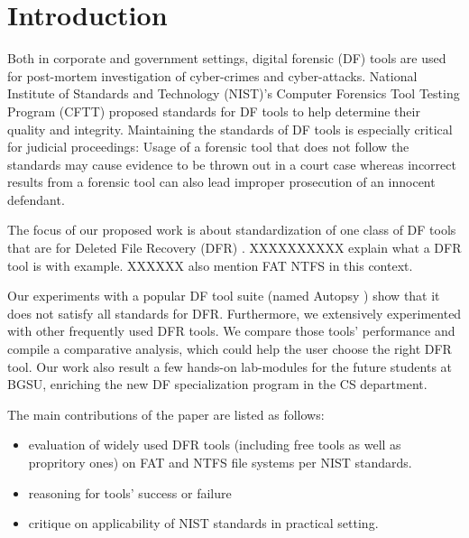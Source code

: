 
\section{Introduction}

Both in corporate and government settings, digital forensic (DF) tools are used for post-mortem investigation of cyber-crimes and cyber-attacks. 
National Institute of Standards and Technology (NIST)'s Computer Forensics Tool Testing Program (CFTT) \cite{cftt:nist} 
proposed standards for DF tools to help determine their quality and integrity. Maintaining the standards of DF tools 
is especially critical for judicial proceedings: Usage of a forensic tool that does not follow the standards may cause evidence to be thrown 
out in a court case whereas incorrect results from a forensic tool can also lead improper prosecution of an innocent defendant. 

The focus of our proposed work is about standardization of one class of DF 
tools that are for Deleted File Recovery (DFR) \cite{meta:dfr:standards}. XXXXXXXXXX explain what a DFR tool is with example. 
XXXXXX also mention FAT NTFS in this context.

 
Our experiments with a popular DF tool suite (named Autopsy \cite{autopsy}) 
show that it does not satisfy all standards for DFR. 
Furthermore, we extensively experimented with other frequently used DFR tools. 
We compare those tools' performance and compile a comparative analysis, which could help the user choose the right DFR tool. 
Our work also result a few hands-on lab-modules for the future students at BGSU, enriching the new DF specialization program in the CS department.

The main contributions of the paper are listed as follows:
\begin{itemize}
\item evaluation of widely used DFR tools (including free tools as well as propritory ones) on FAT and NTFS file systems per NIST standards.
\item reasoning for tools' success or failure
\item critique on applicability of NIST standards in practical setting. 
\end{itemize}
